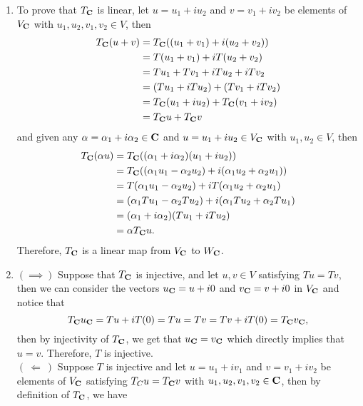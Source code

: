 \begin{solution}
    \begin{enumerate}[label=(\alph*)]
        \item To prove that $T_{\mathbf{C}}$ is linear, let $u = u_1 + iu_2$ and $v = v_1 + iv_2$ be elements of $V_{\mathbf{C}}$ with $u_1, u_2, v_1, v_2 \in V$, then
        \begin{align*}
            T_{\mathbf{C}}(u + v) &= T_{\mathbf{C}}((u_1 + v_1) + i(u_2 + v_2)) \\
            &= T(u_1 + v_1) + iT(u_2 + v_2) \\
            &= Tu_1 + Tv_1 + iTu_2 + iTv_2 \\
            &= (Tu_1 + iTu_2) + (Tv_1 + iTv_2) \\
            &= T_{\mathbf{C}}(u_1 + iu_2) + T_{\mathbf{C}}(v_1 + iv_2) \\
            &= T_{\mathbf{C}}u + T_{\mathbf{C}}v
        \end{align*}
        and given any $\alpha = \alpha_1 + i\alpha_2 \in \mathbf{C}$ and $u = u_1 + iu_2 \in V_{\mathbf{C}}$ with $u_1, u_2 \in V$, then 
        \begin{align*}
            T_{\mathbf{C}}(\alpha u) &= T_{\mathbf{C}}((\alpha_1 + i\alpha_2)(u_1 + iu_2)) \\
            &= T_{\mathbf{C}}((\alpha_1 u_1 - \alpha_2 u_2) + i(\alpha_1 u_2 + \alpha_2 u_1)) \\
            &= T(\alpha_1 u_1 - \alpha_2 u_2) + i T(\alpha_1 u_2 + \alpha_2 u_1) \\
            &= (\alpha_1 Tu_1 - \alpha_2 Tu_2) + i (\alpha_1 Tu_2 + \alpha_2 Tu_1) \\
            &= (\alpha_1 + i\alpha_2)(Tu_1 + iTu_2) \\
            &= \alpha T_{\mathbf{C}}u.
        \end{align*} 
        Therefore, $T_{\mathbf{C}}$ is a linear map from $V_{\mathbf{C}}$ to $W_{\mathbf{C}}$.
        \item $( \implies )$ Suppose that $T_{\mathbf{C}}$ is injective, and let $u,v \in V$ satisfying $Tu = Tv$, then we can consider the vectors $u_{\mathbf{C}} = u + i0$ and $v_{\mathbf{C}} = v + i0$ in $V_{\mathbf{C}}$ and notice that
        $$T_{\mathbf{C}}u_{\mathbf{C}} = Tu + iT(0) = Tu = Tv = Tv + iT(0) = T_{\mathbf{C}}v_{\mathbf{C}},$$
        then by injectivity of $T_{\mathbf{C}}$, we get that $u_{\mathbf{C}} = v_{\mathbf{C}}$ which directly implies that $u = v$. Therefore, $T$ is injective. \\
        $(\ \Longleftarrow \ )$ Suppose $T$ is injective and let $u = u_1 + iv_1$ and $v = v_1 + iv_2$ be elements of $V_{\mathbf{C}}$ satisfying $T_{C}u = T_{\mathbf{C}}v$ with $u_1, u_2, v_1, v_2 \in \mathbf{C}$, then by definition of $T_{\mathbf{C}}$, we have

\end{enumerate}
\end{solution}
